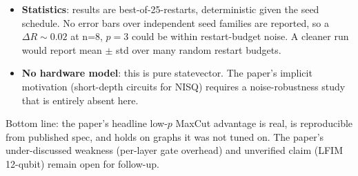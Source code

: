 \documentclass[11pt]{article}
\begin{document}
\begin{itemize}
  \item \textbf{Statistics}: results are best-of-25-restarts, deterministic given the seed schedule. No error bars over independent seed families are reported, so a $\Delta R \sim 0.02$ at n=8, $p=3$ could be within restart-budget noise. A cleaner run would report mean $\pm$ std over many random restart budgets.
  \item \textbf{No hardware model}: this is pure statevector. The paper's implicit motivation (short-depth circuits for NISQ) requires a noise-robustness study that is entirely absent here.
\end{itemize}

Bottom line: the paper's headline low-$p$ MaxCut advantage is real, is reproducible from published spec, and holds on graphs it was not tuned on. The paper's under-discussed weakness (per-layer gate overhead) and unverified claim (LFIM 12-qubit) remain open for follow-up.


\end{document}
